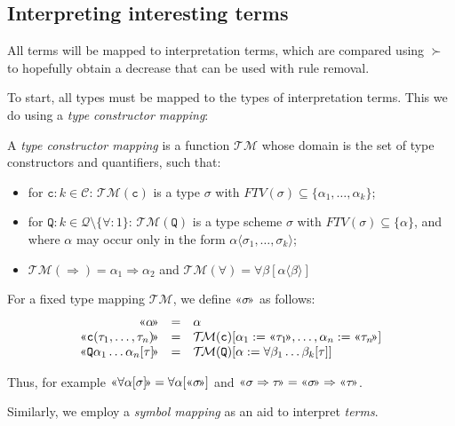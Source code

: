 \documentclass[runningheads,a4paper]{llncs}
\newcommand{\TypeConstructors}{\mathcal{C}}
\newcommand{\TypeQuantifiers}{\mathcal{Q}}
\newcommand{\Typemap}{\mathcal{T\!M}}
\newcommand{\quant}[2]{\forall #1[#2]}
\newcommand{\qquant}[3]{#1 #2[#3]}
\newcommand{\typeinterpret}[1]{\text{\guillemotleft} #1\! \text{\guillemotright}}
\newcommand{\arrtype}{\Rightarrow}
\newcommand{\FTV}{\mathit{FTV}}
\newcommand{\con}{\mathtt{c}}
\begin{document}
\subsection{Interpreting interesting terms}

All terms will be mapped to interpretation terms, which are compared
using $\succ$ to hopefully obtain a decrease that can be used with
rule removal.

To start, all types must be mapped to the types of interpretation
terms.  This we do using a \emph{type constructor mapping}:

\begin{definition}
A \emph{type constructor mapping} is a function $\Typemap$ whose domain
is the set of type constructors and quantifiers, such that:
\begin{itemize}
\item for $\con : k \in \TypeConstructors$:
  $\Typemap(\con)$ is a type $\sigma$ with $\FTV(\sigma) 
  \subseteq \{\alpha_1,\dots,\alpha_k\}$;
\item for $\mathtt{Q} : k \in \TypeQuantifiers \setminus \{\forall:1\}$:
  $\Typemap(\mathtt{Q})$ is a type scheme $\sigma$ with $\FTV(\sigma)
  \subseteq \{ \alpha \}$, and where $\alpha$ may occur only in the
  form $\alpha\langle\sigma_1,\dots,\sigma_k\rangle$;
\item $\Typemap(\arrtype) = \alpha_1 \arrtype \alpha_2$ and
  $\Typemap(\forall) = \quant{\beta}{\alpha\langle\beta\rangle}$
\end{itemize}
For a fixed type mapping $\Typemap$, we define $\typeinterpret{\sigma}$
as follows:
\[
\begin{array}{rcl}
\typeinterpret{\alpha} & = & \alpha \\
\typeinterpret{\con(\tau_1,\dots,\tau_n)} & = &
  \Typemap(\con)[\alpha_1:=\typeinterpret{\tau_1},\dots,\alpha_n:=
  \typeinterpret{\tau_n}] \\
\typeinterpret{\qquant{\mathtt{Q}}{\alpha_1 \dots \alpha_n}{\tau}} & =
  & \Typemap(\mathtt{Q})[\alpha:=\quant{\beta_1 \dots \beta_k}{\tau}] \\
\end{array}
\]
\end{definition}

Thus, for example $\typeinterpret{\quant{\alpha}{\sigma}} =
\quant{\alpha}{\typeinterpret{\sigma}}$ and $\typeinterpret{\sigma
\arrtype \tau} = \typeinterpret{\sigma} \arrtype \typeinterpret{\tau}$.

Similarly, we employ a \emph{symbol mapping} as an aid to interpret
\emph{terms}.
\end{document}

